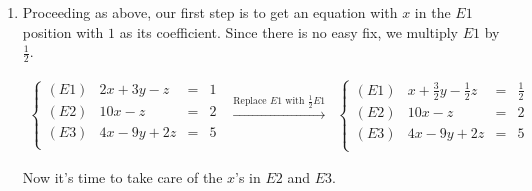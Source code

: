 \begin{ex}
\begin{enumerate}
\[\begin{array}{ccc}
\begin{array}{lrcr}
\end{array} 

\right.

\end{array}\]


Substituting  $z=6$ into $E2$ gives $y - 3 = -3$ so that $y = 0$.  With $y=0$ and $z=6$, $E1$ becomes $x - 0 + 6 = 5$, or $x = -1$.  Hence, our solution is $(-1,0,6)$.  We leave it to the reader to check that substituting the respective values for $x$, $y$, and $z$ into the original system results in three identities.  

Since there is a solution to the system, the system is classified as consistent. Since there are no free variables,\footnote{Again, see Section \ref{AppLinearSystems} for a review of this concept, if needed.}  the system is classified as  independent.

\item  Proceeding as above, our first step is to get an equation with $x$ in the $E1$ position with $1$ as its coefficient.  Since there is no easy fix, we multiply $E1$ by $\frac{1}{2}$.


\[\begin{array}{ccc}

\left\{ 

\begin{array}{lrcr}

(E1) & 2x+3y-z & = & 1 \\ 
(E2) & 10x-z & = & 2 \\
(E3) &  4x-9y+2z & = & 5 \\

\end{array} 

\right.

&
\xrightarrow{\text{Replace $E1$ with $\frac{1}{2}E1$}}

&

\left\{ 

\begin{array}{lrcr}

(E1) & x+\frac{3}{2}y-\frac{1}{2}z & = & \frac{1}{2} \\ 
(E2) & 10x-z & = & 2 \\
(E3) &  4x-9y+2z & = & 5 \\

\end{array} 

\right.
\end{array}\]

Now it's time to take care of the $x$'s in $E2$ and $E3$.


\end{enumerate}
\end{ex}
